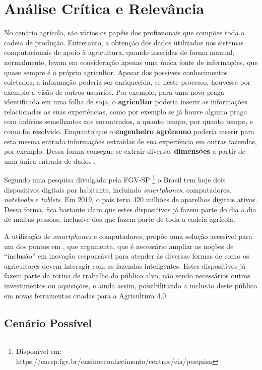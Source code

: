 \documentclass[12pt]{article}
\begin{document}
\section{Análise Crítica e Relevância}
\label{sec:analise_critica_relevancia}

No cenário agrícola, são vários os papéis dos profissionais que compões toda a cadeia de produção. Entretanto, a obtenção dos dados utilizados nos sistemas computacionais de apoio à agricultura, quando inseridas de forma manual, normalmente, levam em consideração apenas uma única fonte de informações, que quase sempre é o próprio agricultor. Apesar dos possíveis conhecimentos coletados, a informação poderia ser enriquecida, se neste processo, houvesse por exemplo a visão de outros usuários. Por exemplo, para uma nova praga identificada em uma folha de soja, o \textbf{agricultor} poderia inserir as informações relacionadas as suas experiências, como por exemplo se já houve alguma praga com indícios semelhantes aos encontrados, a quanto tempo, por quanto tempo, e como foi resolvido. Enquanto que o \textbf{engenheiro agrônomo} poderia inserir para esta mesma entrada informações extraídas de sua experiência em outras fazendas, por exemplo. Dessa forma consegue-se extrair diversas \textbf{dimensões} a partir de uma única entrada de dados \cite{Walling:2020}.

Segundo uma pesquisa divulgada pela FGV-SP \footnote{Disponível em: https://eaesp.fgv.br/ensinoeconhecimento/centros/cia/pesquisa} o Brasil tem hoje dois dispositivos digitais por habitante, incluindo \textit{smartphones}, computadores, \textit{notebooks} e \textit{tablets}. Em 2019, o país teria 420 milhões de aparelhos digitais ativos. Dessa forma, fica bastante claro que estes dispositivos já fazem parte do dia a dia de muitas pessoas, inclusive dos que fazem parte de toda a cadeia agrícola.

A utilização de \textit{smartphones} e computadores, propõe uma solução acessível para um dos pontos em \cite{Rose:2019}, que argumenta, que é necessário ampliar as noções de ``inclusão'' em inovação responsável para atender às diversas formas de como os agricultores devem interagir com as fazendas inteligentes. Estes dispositivos já fazem parte da rotina de trabalho do público alvo, não sendo necessários outros investimentos ou aquisições, e ainda assim, possibilitando a inclusão deste público em novas ferramentas criadas para a Agricultura 4.0.

\subsection{Cenário Possível}
\label{sec:cenario_possivel}
\end{document}
